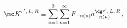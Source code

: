 \begin{equation}\label{k-mode}
{\mc K}^{r^\prime,\,L,\,R}\equiv\sum_{u=1}^3\sum_{n=1}^{\infty}F_{-n(u)}a^{\dg r^\prime,\,L,\,R}_{-n(u)}\,,
\end{equation}

